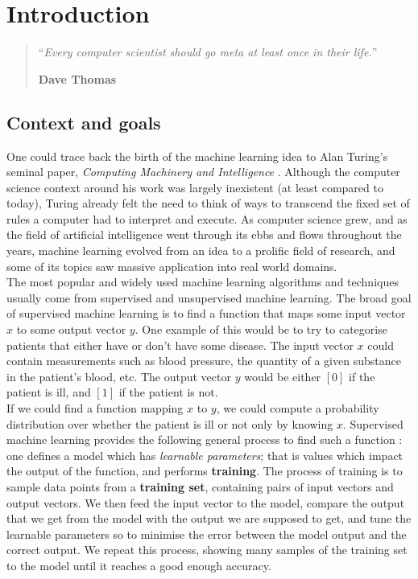 \chapter{Introduction}
\setcounter{page}{1}
\begin{quotation}
\noindent ``\emph{Every computer scientist should go meta at least once in
	their life.}''
\begin{flushright}\textbf{Dave Thomas}\end{flushright}
\end{quotation}

\vspace*{0.5cm}

\section{Context and goals}
One could trace back the birth of the machine learning idea to Alan Turing's 
seminal paper, \textit{Computing Machinery and Intelligence} 
\cite{turing1950computing}. Although the computer science context around his
work was largely inexistent (at least compared to today), Turing already felt
the need to think of ways to transcend the fixed set of rules a computer had
to interpret and execute. As computer science grew, and as the field of
artificial intelligence went through its ebbs and flows throughout the years,
machine learning evolved from an idea to a prolific field of research, and
some of its topics saw massive application into real world domains.\\

The most popular and widely used machine learning algorithms and techniques
usually come from supervised and unsupervised machine learning.
The broad goal of supervised machine learning is to find a function that maps
some input vector $x$ to some output vector $y$. One example of this would be
to try to categorise patients that either have or don't have some disease. 
The input vector $x$ could contain measurements such as blood pressure, the 
quantity of a given substance in the patient's blood, etc. The output vector
$y$ would be either $[0]$ if the patient is ill, and $[1]$ if the patient is
not.\\

If we could find a function mapping $x$ to $y$, we could compute a probability
distribution over whether the patient is ill or not only by knowing $x$. 
Supervised machine learning provides the following general process to find
such a function : one defines a model which has
\textit{learnable parameters}; that is values which impact the output of the
function, and performs \textbf{training}. The process of training is to
sample data points from a \textbf{training set}, containing pairs of input
vectors and output vectors. We then feed the input vector to the model, compare
the output that we get from the model with the output we are supposed to get,
and tune the learnable parameters so to minimise the error between the model
output and the correct output. We repeat this process, showing many samples
of the training set to the model until it reaches a good enough accuracy.

